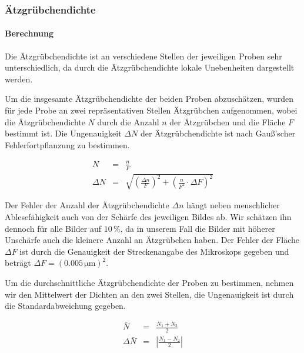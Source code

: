 \documentclass[12pt,a4paper]{scrartcl}
\numberwithin{equation}{section} %
\renewcommand{\[}{} %
\renewcommand{\]}{\noindent} %
\begin{document}
\hypertarget{uxe4tzgruxfcbchendichte}{%
\subsubsection{Ätzgrübchendichte}\label{uxe4tzgruxfcbchendichte}}

\hypertarget{berechnung}{%
\paragraph{Berechnung}\label{berechnung}}

Die Ätzgrübchendichte ist an verschiedene Stellen der jeweiligen Proben
sehr unterschiedlich, da durch die Ätzgrübchendichte lokale Unebenheiten
dargestellt werden.

Um die insgesamte Ätzgrübchendichte der beiden Proben abzuschätzen,
wurden für jede Probe an zwei repräsentativen Stellen Ätzgrübchen
aufgenommen, wobei die Ätzgrübchendichte \(N\) durch die Anzahl \(n\)
der Ätzgrübchen und die Fläche \(F\) bestimmt ist. Die Ungenauigkeit
\(\Delta N\) der Ätzgrübchendichte ist nach Gauß'scher
Fehlerfortpflanzung zu bestimmen.

\[
\begin{eqnarray}
    N &=& \frac{n}{F} \label{N}\\
    \Delta N &=& \sqrt{
        \left(\frac{\Delta n}{F}\right)^2
        + \left(\frac{n}{F^2} \cdot \Delta F\right)^2} \label{DeltaN}
\end{eqnarray}
\]

Der Fehler der Anzahl der Ätzgrübchendichte \(\Delta n\) hängt neben
menschlicher Ablesefähigkeit auch von der Schärfe des jeweiligen Bildes
ab. Wir schätzen ihn dennoch für alle Bilder auf \(10\,\%\), da in
unserem Fall die Bilder mit höherer Unschärfe auch die kleinere Anzahl
an Ätzgrübchen haben. Der Fehler der Fläche \(\Delta F\) ist durch die
Genauigkeit der Streckenangabe des Mikroskops gegeben und beträgt
\(\Delta F=(0.005 \mathrm{\, \mu m})^2\).

Um die durchschnittliche Ätzgrübchendichte der Proben zu bestimmen,
nehmen wir den Mittelwert der Dichten an den zwei Stellen, die
Ungenauigkeit ist durch die Standardabweichung gegeben.

\[
\begin{eqnarray}
    \bar{N} &=& \frac{N_1 + N_2}{2} \label{Nbar}\\
    \Delta \bar N &=& \left| \frac{N_1 - N_2}{2} \right| \label{DeltaNbar}
\end{eqnarray}
\]
\end{document}
